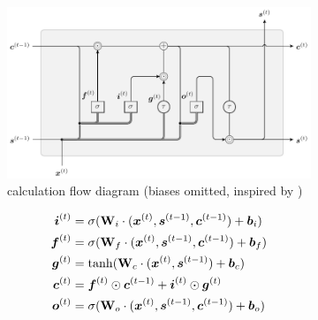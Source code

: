 \begin{figure}[H]
  \centering
  \begin{subfigure}[]{\textwidth}
    \begin{center}
    \includegraphics[]{figs/lstm.pdf}
    \end{center}
    \caption{calculation flow diagram (biases omitted, inspired by \cite{Colah2015})}
    \label{fig:lstm} 
  \end{subfigure}
  \begin{subfigure}[]{\textwidth}
    \begin{subequations}
      \begin{align}
        \vc{i}\tm{t} 
        &= 
          \sigma
          (
          \mt{W}_i \cdot
          (
          \x\tm{t},
          \vc{s}\tm{t-1},
          \vc{c}\tm{t-1}
          )
          +\vc{b}_i
          ) 
        \\
        \vc{f}\tm{t} 
        &=
          \sigma
          (
          \mt{W}_f \cdot
          (
          \x\tm{t},
          \vc{s}\tm{t-1},
          \vc{c}\tm{t-1}
          )
          +\vc{b}_f
          )
        \\
        \vc{g}\tm{t}
        &=
          \tanh
          (
          \mt{W}_c \cdot
          (
          \x\tm{t},
          \vc{s}\tm{t-1}
          )
          +\vc{b}_c
          )
        \\
        \vc{c}\tm{t} 
        &= 
          \vc{f}\tm{t}   \odot \vc{c}\tm{t-1}
          + \vc{i}\tm{t} \odot \vc{g}\tm{t}
        \label{eqn:lstms}\\
        \vc{o}\tm{t}
        &=
          \sigma
          (
          \mt{W}_o \cdot
          (
          \x\tm{t},
          \vc{s}\tm{t-1},
          \vc{c}\tm{t-1}
          )
          +\vc{b}_o
          )
        \\

\end{align}
\end{subequations}
\end{subfigure}
\end{figure}
